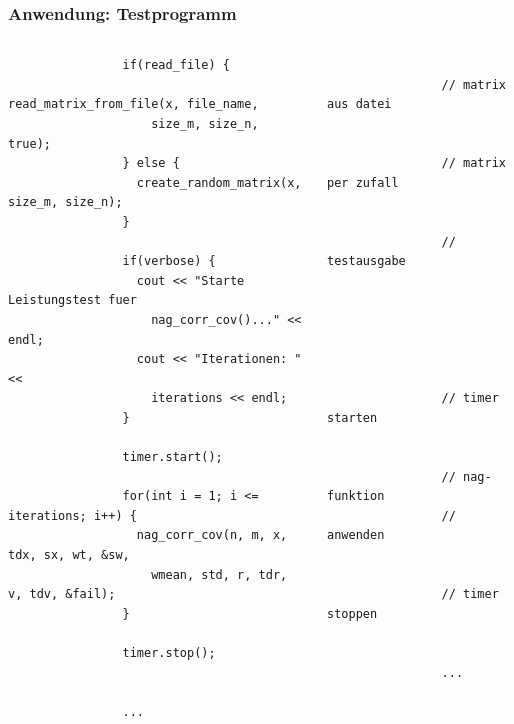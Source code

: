 \documentclass{beamer}
\begin{document}
\begin{frame}[fragile]
  \frametitle{Anwendung: Testprogramm}
	
	\begin{columns}
			\begin{lstlisting}
				if(read_file) {
				  read_matrix_from_file(x, file_name,
				    size_m, size_n, true);
				} else {
				  create_random_matrix(x, size_m, size_n);
				}
				
				if(verbose) {
				  cout << "Starte Leistungstest fuer
				    nag_corr_cov()..." << endl;
				  cout << "Iterationen: " <<
				    iterations << endl;
				}
				
				timer.start();
				
				for(int i = 1; i <= iterations; i++) {
				  nag_corr_cov(n, m, x, tdx, sx, wt, &sw,
				    wmean, std, r, tdr, v, tdv, &fail);
				}
				
				timer.stop();
				
				
				...
			\end{lstlisting}
			\begin{lstlisting}
				
				// matrix aus datei
				
				
				// matrix per zufall
				
				
				// testausgabe
				
				
				
				
				
				
				// timer starten
				
				
				// nag-funktion
				// anwenden
				
				
				// timer stoppen
				
				
				...
			\end{lstlisting}
	\end{columns}
\end{frame}
\end{document}
